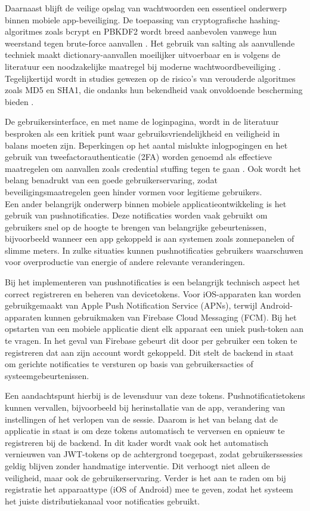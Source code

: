 Daarnaast blijft de veilige opslag van wachtwoorden een essentieel onderwerp binnen mobiele app-beveiliging. De toepassing van cryptografische hashing-algoritmes zoals bcrypt en PBKDF2 wordt breed aanbevolen vanwege hun weerstand tegen brute-force aanvallen \autocite{Gupta2022}. Het gebruik van salting als aanvullende techniek maakt dictionary-aanvallen moeilijker uitvoerbaar en is volgens de literatuur een noodzakelijke maatregel bij moderne wachtwoordbeveiliging \autocite{Arias2025}. Tegelijkertijd wordt in studies gewezen op de risico’s van verouderde algoritmes zoals MD5 en SHA1, die ondanks hun bekendheid vaak onvoldoende bescherming bieden \autocite{ReesCarter2024}.

De gebruikersinterface, en met name de loginpagina, wordt in de literatuur besproken als een kritiek punt waar gebruiksvriendelijkheid en veiligheid in balans moeten zijn. Beperkingen op het aantal mislukte inlogpogingen en het gebruik van tweefactorauthenticatie (2FA) worden genoemd als effectieve maatregelen om aanvallen zoals credential stuffing tegen te gaan \autocite{Chinnasamy2025, Jurisons2024}. Ook wordt het belang benadrukt van een goede gebruikerservaring, zodat beveiligingsmaatregelen geen hinder vormen voor legitieme gebruikers.\\

Een ander belangrijk onderwerp binnen mobiele applicatieontwikkeling is het gebruik van pushnotificaties. Deze notificaties worden vaak gebruikt om gebruikers snel op de hoogte te brengen van belangrijke gebeurtenissen, bijvoorbeeld wanneer een app gekoppeld is aan systemen zoals zonnepanelen of slimme meters. In zulke situaties kunnen pushnotificaties gebruikers waarschuwen voor overproductie van energie of andere relevante veranderingen.

Bij het implementeren van pushnotificaties is een belangrijk technisch aspect het correct registreren en beheren van devicetokens. Voor iOS-apparaten kan worden gebruikgemaakt van Apple Push Notification Service (APNs), terwijl Android-apparaten kunnen gebruikmaken van Firebase Cloud Messaging (FCM). Bij het opstarten van een mobiele applicatie dient elk apparaat een uniek push-token aan te vragen. In het geval van Firebase gebeurt dit door per gebruiker een token te registreren dat aan zijn account wordt gekoppeld. Dit stelt de backend in staat om gerichte notificaties te versturen op basis van gebruikersacties of systeemgebeurtenissen.

Een aandachtspunt hierbij is de levensduur van deze tokens. Pushnotificatietokens kunnen vervallen, bijvoorbeeld bij herinstallatie van de app, verandering van instellingen of het verlopen van de sessie. Daarom is het van belang dat de applicatie in staat is om deze tokens automatisch te verversen en opnieuw te registreren bij de backend. In dit kader wordt vaak ook het automatisch vernieuwen van JWT-tokens op de achtergrond toegepast, zodat gebruikerssessies geldig blijven zonder handmatige interventie. Dit verhoogt niet alleen de veiligheid, maar ook de gebruikerservaring. Verder is het aan te raden om bij registratie het apparaattype (iOS of Android) mee te geven, zodat het systeem het juiste distributiekanaal voor notificaties gebruikt.

